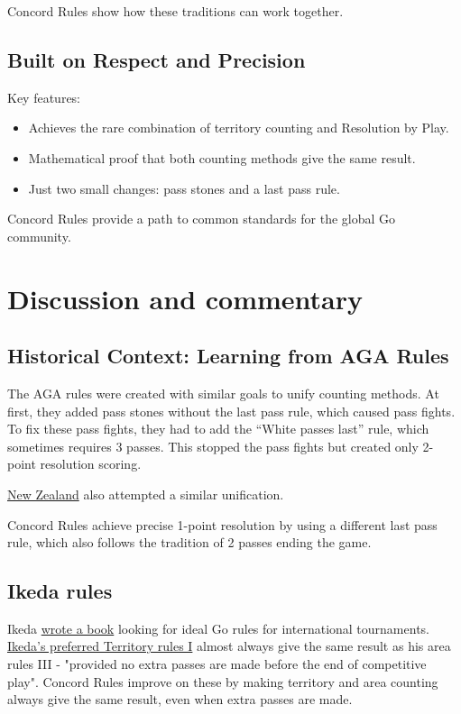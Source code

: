 \documentclass[11pt]{article}
\begin{document}
Concord Rules show how these traditions can work together.

\subsection*{Built on Respect and Precision}

Key features:

\begin{itemize}
\item Achieves the rare combination of territory counting and Resolution by Play.
\item Mathematical proof that both counting methods give the same result.
\item Just two small changes: pass stones and a last pass rule.
\end{itemize}

Concord Rules provide a path to common standards for the global Go community.

\newpage
\section*{Discussion and commentary}

\subsection*{Historical Context: Learning from AGA Rules}

The AGA rules were created with similar goals to unify counting methods.
At first, they added pass stones without the last pass rule, which caused pass fights.
To fix these pass fights, they had to add the ``White passes last'' rule, which sometimes requires 3 passes.
This stopped the pass fights but created only 2-point resolution scoring.

\href{https://go.org.nz/index.php/about-go/history-of-nz-rules-of-go}{New Zealand} also attempted a similar unification.

Concord Rules achieve precise 1-point resolution by using a different last pass rule, which also follows the tradition of 2 passes ending the game.

\subsection*{Ikeda rules}
Ikeda \href{https://gobase.org/studying/rules/ikeda/}{wrote a book} looking for ideal Go rules for international tournaments.
\href{https://gobase.org/studying/rules/ikeda/?sec=e_rules}{Ikeda's preferred Territory rules I} almost always give the same result as his area rules III
- "provided no extra passes are made before the end of competitive play".
Concord Rules improve on these by making territory and area counting always give the same result, even when extra passes are made.
\end{document}
